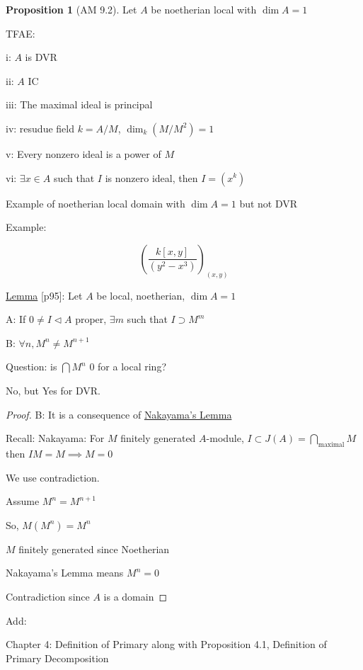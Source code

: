 \documentclass{article}
\theoremstyle{definition}
\newtheorem{proposition}{Proposition}
\begin{document}
\begin{proposition}
    [AM 9.2] Let \(A\) be noetherian local with \(\dim A = 1\)
    
    TFAE:

    i: \(A\) is DVR
    
    ii: \(A\) IC

    iii: The maximal ideal is principal

    iv: resudue field \(k = A / M\), \(\dim_k (M / M^2) = 1\)
    
    v: Every nonzero ideal is a power of \(M\) 

    vi: \(\exists x\in A\) such that \(I\) is nonzero ideal, then \(I = (x^k)\)   

\end{proposition}

Example of noetherian local domain with \(\dim A = 1\) but not DVR 

Example:

\[
    \left( \frac{k[x,y]}{(y^2 - x^3)} \right)_{(x,y)} 
\]

\underline{Lemma} [p95]: Let \(A\) be local, noetherian, \(\dim A = 1\)

A: If \(0 \neq I \triangleleft A\) proper, \(\exists m\) such that \(I \supset M^m\)

B: \(\forall n, M^n \neq M^{n+1}\) 

Question: is \(\bigcap M^n\) 0 for a local ring?

No, but Yes for DVR.

\begin{proof}
    B: It is a consequence of \underline{Nakayama's Lemma} 

    Recall: Nakayama: For \(M\) finitely generated \(A\)-module, \(I \subset J(A) = \bigcap_{\text{maximal}} M\) then \(IM = M \implies M = 0\)
    
    We use contradiction.

    Assume \(M^n = M^{n+1}\) 

    So, \(M(M^n)=M^n\)

    \(M\) finitely generated since Noetherian

    Nakayama's Lemma means \(M^n = 0\) 

    Contradiction since \(A\) is a domain
    
\end{proof}

Add:

Chapter 4: Definition of Primary along with Proposition 4.1, Definition of Primary Decomposition
\end{document}
